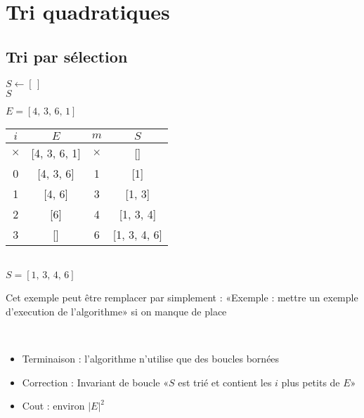 \section{Tri quadratiques}

\subsection{Tri par sélection}

\begin{minipage}{0.5\linewidth}
	\begin{algorithm}[H]
		\caption{$Tri\_par\_selection(E)$}
		$S \gets [\,]$\\
		\Retour $S$
	\end{algorithm}
\end{minipage} \begin{minipage}{0.5\linewidth}
	\begin{example} \normalfont
		\begin{center}$E = [4, \, 3, \, 6, \, 1]$\\
			\begin{tabular}{|c|c|c|c|}
				\hline $i$ & $E$ & $m$ & $S$\\
				\hline $\times$ & [4, 3, 6, 1] & $\times$ & []\\
				\hline 0 & [4, 3, 6] & 1 & [1]\\
				\hline 1 & [4, 6] & 3 & [1, 3]\\
				\hline 2 & [6] & 4 & [1, 3, 4]\\
				\hline 3 & [] & 6 & [1, 3, 4, 6]\\
				\hline
			\end{tabular}\\
			$S = [1, \, 3, \, 4, \, 6]$
		\end{center}
	\end{example}
\end{minipage}

\begin{com}
	Cet exemple peut être remplacer par simplement : «Exemple : mettre un exemple d'execution de l'algorithme» si on manque de place
\end{com}

\begin{proposition}
	\enspace\\
	\begin{itemize}[label=$\star$]
		\item Terminaison : l'algorithme n'utilise que des boucles bornées
		\item Correction : Invariant de boucle «$S$ est trié et contient les $i$ plus petits de $E$»
		\item Cout : environ $|E|^2$
	\end{itemize}
\end{proposition}


